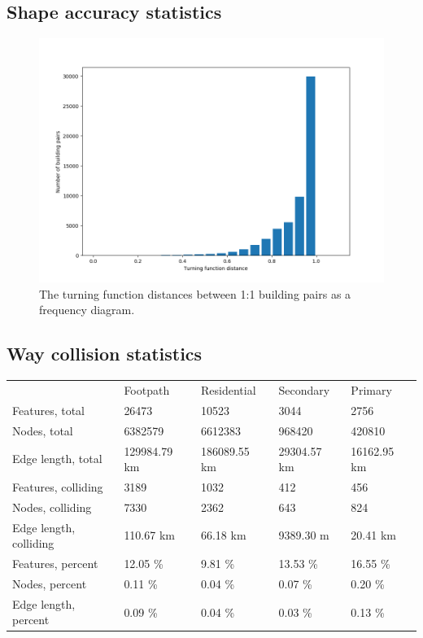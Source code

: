 \documentclass[a4paper]{article}
\begin{document}
\subsection{Shape accuracy statistics}


\begin{figure}[H]
    \centering
    \includegraphics[width=\textwidth,height=0.5\textheight,keepaspectratio]{img_turning_function_plot}
    \caption{The turning function distances between 1:1 building pairs as a frequency diagram.}
    \label{fig:space}
\end{figure}


\subsection{Way collision statistics}

\begin{table}[H]
\begin{tabular}{lllll}
                            & Footpath      & Residential  & Secondary   & Primary     \\
    Features, total         & 26473         & 10523        & 3044        & 2756        \\
    Nodes, total            & 6382579       & 6612383      & 968420      & 420810      \\
    Edge length, total      & 129984.79 km  & 186089.55 km & 29304.57 km & 16162.95 km \\
    Features, colliding     & 3189          & 1032         & 412         & 456         \\
    Nodes, colliding        & 7330          & 2362         & 643         & 824         \\
    Edge length, colliding  & 110.67 km     & 66.18 km     & 9389.30 m   & 20.41 km    \\
    Features, percent       & 12.05 \%      & 9.81 \%      & 13.53 \%    & 16.55 \%    \\
    Nodes, percent          & 0.11 \%       & 0.04 \%      & 0.07 \%     & 0.20 \%     \\
    Edge length, percent    & 0.09 \%       & 0.04 \%      & 0.03 \%     & 0.13 \%

\end{tabular}
\end{table}
\end{document}
